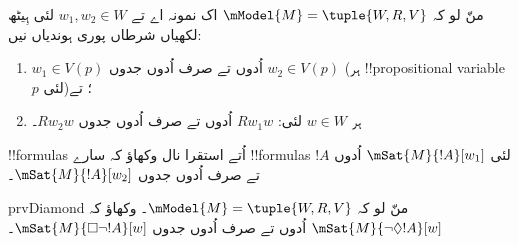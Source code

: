 \documentclass[../../../include/open-logic-section]{subfiles}
\begin{document}
\begin{prob}
  منّ لو کہ $\mModel{M} = \tuple{W, R, V}$ اک نمونہ اے تے $w_1, w_2 \in
  W$ لئی ہِیٹھ لکھیاں شرطاں پوری ہوندیاں نیں:
  \begin{enumerate}
  \item $w_1 \in V(p)$ اُدوں تے صرف اُدوں جدوں $w_2 \in V(p)$ (ہر !!{propositional variable} $p$ لئی)؛ تے
  \item ہر $w \in W$ لئی: $Rw_1w$ اُدوں تے صرف اُدوں جدوں $Rw_2w$۔
  \end{enumerate}
  !!{formula}s اُتے استقرا نال وکھاؤ کہ سارے !!{formula}s $!A$ لئی
  $\mSat{M}{!A}[w_1]$ اُدوں تے صرف اُدوں جدوں $\mSat{M}{!A}[w_2]$۔
\end{prob}

\begin{probtag}{prvDiamond}
  منّ لو کہ $\mModel{M} = \tuple{W, R, V}$۔ وکھاؤ کہ
  $\mSat{M}{\lnot\Diamond !A}[w]$ اُدوں تے صرف اُدوں جدوں
  $\mSat{M}{\Box\lnot!A}[w]$۔
\end{probtag}
\end{document}
